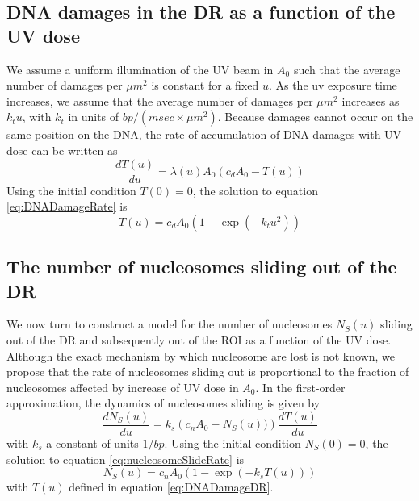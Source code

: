 \documentclass[12pt]{article}
\begin{document}
	\subsection{DNA damages in the DR as a function of the UV dose}\label{subsection:AccumulationOfDNADamagesInTheDR}
	 We assume a uniform illumination of the UV beam in $A_0$ such that the average number of damages per $\mu m^2$ is constant for a fixed $u$. As the uv exposure time increases, we assume that the average number of damages per $\mu m^2$ increases as $k_tu$, with $k_t$ in units of $bp/(msec\times \mu m^2)$. Because damages cannot occur on the same position on the DNA, the rate of accumulation of DNA damages with UV dose can be written as
	\begin{equation}\label{eq:DNADamageRate}
	\frac{dT(u)}{du} = \lambda(u)A_0(c_dA_0 - T(u))
	\end{equation}	
	 Using the initial condition $T(0) = 0$, the solution to equation \eqref{eq:DNADamageRate} is
	\begin{equation}\label{eq:DNADamageDR}
		T(u) = c_dA_0(1-\exp(-k_tu^2))
	\end{equation}
	
	\subsection{The number of nucleosomes sliding out of the DR}
	We now turn to construct a model for the number of nucleosomes $N_S(u)$
	sliding out of the DR and subsequently out of the ROI as a function of the UV dose. Although the exact mechanism by which nucleosome are lost is not known, 
	we propose that the rate of nucleosomes sliding out is proportional to the fraction of nucleosomes affected by increase of UV dose in $A_0$. In the first-order approximation, the dynamics of nucleosomes sliding is given by
	\begin{equation}\label{eq:nucleosomeSlideRate}
	\frac{dN_S(u)}{du} = k_s\left(c_nA_0-N_S(u))\right)\frac{dT(u)}{du}	 
	\end{equation}
	with $k_s$ a constant of units $1/bp$. Using the initial condition $N_S(0)=0$, the solution to equation \eqref{eq:nucleosomeSlideRate} is 
	\begin{equation}\label{eq:nucleosomeSlideDR}
	N_S(u)= c_nA_0\left(1-\exp(-k_sT(u))\right)
	\end{equation}
	with $T(u)$ defined in equation \eqref{eq:DNADamageDR}.
\end{document}
